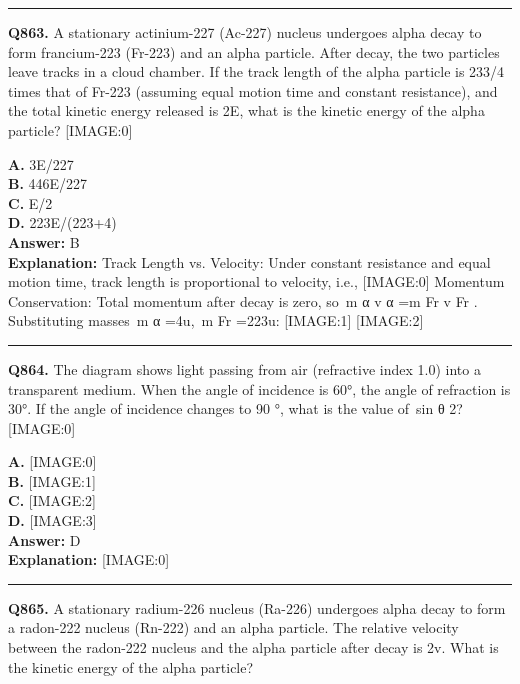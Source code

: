 \documentclass[12pt]{article}
\begin{document}
\hrule
\vspace{1em}


\noindent
\textbf{Q863.} A stationary actinium-227 (Ac-227) nucleus undergoes alpha decay to form francium-223 (Fr-223) and an alpha particle. After decay, the two particles leave tracks in a cloud chamber. If the track length of the alpha particle is 233/4 times that of Fr-223 (assuming equal motion time and constant resistance), and the total kinetic energy released is 2E, what is the kinetic energy of the alpha particle?
[IMAGE:0]



\textbf{A.} 3E/227 \\
\textbf{B.} 446E/227 \\
\textbf{C.} E/2 \\
\textbf{D.} 223E/(223+4) \\

\textbf{Answer:} B \\
\textbf{Explanation:} Track Length vs. Velocity: Under constant resistance and equal motion time, track length is proportional to velocity, i.e.,
[IMAGE:0]
Momentum Conservation: Total momentum after decay is zero, so m
α
v
α
=m
Fr
v
Fr
​. Substituting masses m
α
=4u, m
Fr
=223u:
[IMAGE:1]
[IMAGE:2]

\hrule
\vspace{1em}


\noindent
\textbf{Q864.} The diagram shows light passing from air (refractive index 1.0) into a transparent medium. When the angle of incidence is 60°, the angle of refraction is 30°. If the angle of incidence changes to
90
°, what is the value of sin
θ
2?
[IMAGE:0]



\textbf{A.} [IMAGE:0] \\
\textbf{B.} [IMAGE:1] \\
\textbf{C.} [IMAGE:2] \\
\textbf{D.} [IMAGE:3] \\

\textbf{Answer:} D \\
\textbf{Explanation:} [IMAGE:0]

\hrule
\vspace{1em}


\noindent
\textbf{Q865.} A stationary radium-226 nucleus (Ra-226) undergoes alpha decay to form a radon-222 nucleus (Rn-222) and an alpha particle. The relative velocity between the radon-222 nucleus and the alpha particle after decay is 2v. What is the kinetic energy of the alpha particle?
\end{document}
